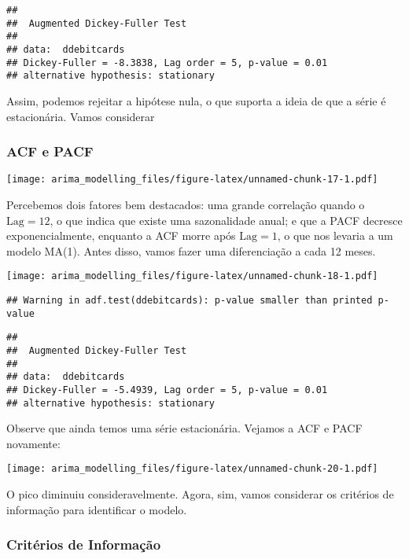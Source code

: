 \documentclass[]{article}
\begin{document}
\begin{verbatim}
## 
##  Augmented Dickey-Fuller Test
## 
## data:  ddebitcards
## Dickey-Fuller = -8.3838, Lag order = 5, p-value = 0.01
## alternative hypothesis: stationary
\end{verbatim}

Assim, podemos rejeitar a hipótese nula, o que suporta a ideia de que a
série é estacionária. Vamos considerar

\hypertarget{acf-e-pacf}{%
\subsubsection{ACF e PACF}\label{acf-e-pacf}}

\texttt{[image: arima\_modelling\_files/figure-latex/unnamed-chunk-17-1.pdf]}

Percebemos dois fatores bem destacados: uma grande correlação quando o
\(\text{Lag} = 12\), o que indica que existe uma sazonalidade anual; e
que a PACF decresce exponencialmente, enquanto a ACF morre após
\(\text{Lag} = 1\), o que nos levaria a um modelo MA(1). Antes disso,
vamos fazer uma diferenciação a cada 12 meses.

\texttt{[image: arima\_modelling\_files/figure-latex/unnamed-chunk-18-1.pdf]}

\begin{verbatim}
## Warning in adf.test(ddebitcards): p-value smaller than printed p-value
\end{verbatim}

\begin{verbatim}
## 
##  Augmented Dickey-Fuller Test
## 
## data:  ddebitcards
## Dickey-Fuller = -5.4939, Lag order = 5, p-value = 0.01
## alternative hypothesis: stationary
\end{verbatim}

Observe que ainda temos uma série estacionária. Vejamos a ACF e PACF
novamente:

\texttt{[image: arima\_modelling\_files/figure-latex/unnamed-chunk-20-1.pdf]}

O pico diminuiu consideravelmente. Agora, sim, vamos considerar os
critérios de informação para identificar o modelo.

\hypertarget{crituxe9rios-de-informauxe7uxe3o}{%
\subsubsection{Critérios de
Informação}\label{crituxe9rios-de-informauxe7uxe3o}}
\end{document}
